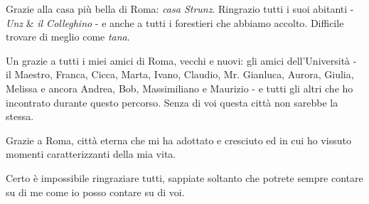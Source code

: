 \begin{acknowledgements}
    Grazie alla casa più bella di Roma: \textit{casa Strunz}. Ringrazio tutti i suoi abitanti - \textit{Unz} \& \textit{il Colleghino} - e anche a tutti i forestieri che abbiamo accolto. Difficile trovare di meglio come \textit{tana}.
    
    Un grazie a tutti i miei amici di Roma, vecchi e nuovi: gli amici dell'Università - il Maestro, Franca, Cicca, Marta, Ivano, Claudio, Mr. Gianluca, Aurora, Giulia, Melissa e ancora Andrea, Bob, Massimiliano e Maurizio - e tutti gli altri che ho incontrato durante questo percorso. Senza di voi questa città non sarebbe la stessa.
    
    Grazie a Roma, città eterna che mi ha adottato e cresciuto ed in cui ho vissuto momenti caratterizzanti della mia vita.
    
    Certo è impossibile ringraziare tutti, sappiate soltanto che potrete sempre contare su di me come io posso contare su di voi. 
\end{acknowledgements}